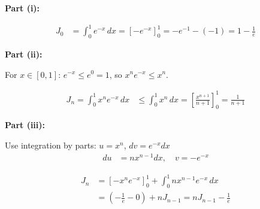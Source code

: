 \begin{solution}
\textbf{Part (i):}

\begin{align*}
J_0 &= \int_{0}^{1} e^{-x} \, dx = \left[ -e^{-x} \right]_{0}^{1} = -e^{-1} - (-1) = \boxed{1 - \frac{1}{e}}
\end{align*}

\textbf{Part (ii):}

For $x \in [0, 1]$: $e^{-x} \le e^0 = 1$, so $x^n e^{-x} \le x^n$.

\begin{align*}
J_n = \int_{0}^{1} x^n e^{-x} \, dx &\le \int_{0}^{1} x^n \, dx = \left[ \frac{x^{n+1}}{n+1} \right]_{0}^{1} = \boxed{\frac{1}{n+1}}
\end{align*}

\textbf{Part (iii):}

Use integration by parts: $u = x^n$, $dv = e^{-x}dx$
\begin{align*}
du &= nx^{n-1}dx, \quad v = -e^{-x}
\end{align*}

\begin{align*}
J_n &= \left[ -x^n e^{-x} \right]_{0}^{1} + \int_{0}^{1} n x^{n-1} e^{-x} \, dx \\
&= \left( -\frac{1}{e} - 0 \right) + n J_{n-1} = \boxed{n J_{n-1} - \frac{1}{e}}
\end{align*}
\end{solution}

